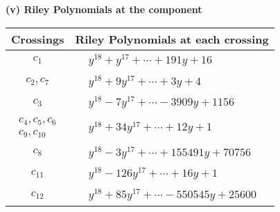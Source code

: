 \documentclass[1p]{elsarticle_modified}
\theoremstyle{definition}
\begin{document}
\newpage\renewcommand{\arraystretch}{1}
\flushleft \textbf{(v) Riley Polynomials at the component}\newline \\
\begin{tabular}{m{50pt}|m{274pt}}
Crossings & \hspace{64pt}Riley Polynomials at each crossing \\
\hline $$\begin{aligned}c_{1}\end{aligned}$$&$\begin{aligned}
&y^{18}+y^{17}+\cdots+191 y+16
\end{aligned}$\\
\hline $$\begin{aligned}c_{2},c_{7}\end{aligned}$$&$\begin{aligned}
&y^{18}+9 y^{17}+\cdots+3 y+4
\end{aligned}$\\
\hline $$\begin{aligned}c_{3}\end{aligned}$$&$\begin{aligned}
&y^{18}-7 y^{17}+\cdots-3909 y+1156
\end{aligned}$\\
\hline $$\begin{aligned}c_{4},c_{5},c_{6}\\c_{9},c_{10}\end{aligned}$$&$\begin{aligned}
&y^{18}+34 y^{17}+\cdots+12 y+1
\end{aligned}$\\
\hline $$\begin{aligned}c_{8}\end{aligned}$$&$\begin{aligned}
&y^{18}-3 y^{17}+\cdots+155491 y+70756
\end{aligned}$\\
\hline $$\begin{aligned}c_{11}\end{aligned}$$&$\begin{aligned}
&y^{18}-126 y^{17}+\cdots+16 y+1
\end{aligned}$\\
\hline $$\begin{aligned}c_{12}\end{aligned}$$&$\begin{aligned}
&y^{18}+85 y^{17}+\cdots-550545 y+25600
\end{aligned}$\\
\hline
\end{tabular}\\~\\
\end{document}
